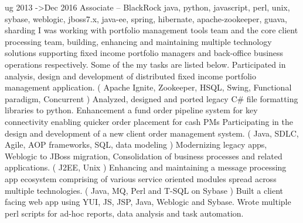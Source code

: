\cventry
ug 2013 ->Dec 2016 Associate – BlackRock
java, python, javascript, perl, unix, sybase, weblogic, jboss7.x, java-ee, spring, hibernate, apache-zookeeper, guava, sharding
I was working with portfolio management tools team and the core client processing team, building, enhancing and maintaining multiple technology solutions
supporting fixed income portfolio managers and back-office business operations respectively. Some of the my tasks are listed below.
Participated in analysis, design and development of distributed fixed income portfolio management application. ( Apache Ignite, Zookeeper, HSQL,
Swing, Functional paradigm, Concurrent )
Analyzed, designed and ported legacy C\# file formatting libraries to python.
Enhancement a fund order pipeline system for key connectivity enabling quicker order placement for cash PMs
Participating in the design and development of a new client order management system. ( Java, SDLC, Agile, AOP frameworks, SQL, data modeling )
Modernizing legacy apps, Weblogic to JBoss migration, Consolidation of business processes and related applications. ( J2EE, Unix )
Enhancing and maintaining a message processing app ecosystem comprising of various service oriented modules spread across multiple technologies. (
Java, MQ, Perl and T-SQL on Sybase )
Built a client facing web app using YUI, JS, JSP, Java, Weblogic and Sybase.
Wrote multiple perl scripts for ad-hoc reports, data analysis and task automation.